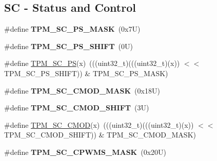 \subsection*{SC -\/ Status and Control}
\begin{DoxyCompactItemize}
\item 
\mbox{\label{group___t_p_m___register___masks_gab20218cf8b49b4d2aa932cfafdf5a43e}} 
\#define {\bfseries T\+P\+M\+\_\+\+S\+C\+\_\+\+P\+S\+\_\+\+M\+A\+SK}~(0x7\+U)
\item 
\mbox{\label{group___t_p_m___register___masks_ga13fca37c98cc93640be8ed1733cb9805}} 
\#define {\bfseries T\+P\+M\+\_\+\+S\+C\+\_\+\+P\+S\+\_\+\+S\+H\+I\+FT}~(0\+U)
\item 
\#define \mbox{\hyperlink{group___t_p_m___register___masks_ga41fa7e0f125e9bdeaf17b70dea969399}{T\+P\+M\+\_\+\+S\+C\+\_\+\+PS}}(x)~(((uint32\+\_\+t)(((uint32\+\_\+t)(x)) $<$$<$ T\+P\+M\+\_\+\+S\+C\+\_\+\+P\+S\+\_\+\+S\+H\+I\+FT)) \& T\+P\+M\+\_\+\+S\+C\+\_\+\+P\+S\+\_\+\+M\+A\+SK)
\item 
\mbox{\label{group___t_p_m___register___masks_ga86346adaa1aec83adbcf3a21289d6400}} 
\#define {\bfseries T\+P\+M\+\_\+\+S\+C\+\_\+\+C\+M\+O\+D\+\_\+\+M\+A\+SK}~(0x18\+U)
\item 
\mbox{\label{group___t_p_m___register___masks_ga9268286302a41feb004444a7b368af69}} 
\#define {\bfseries T\+P\+M\+\_\+\+S\+C\+\_\+\+C\+M\+O\+D\+\_\+\+S\+H\+I\+FT}~(3\+U)
\item 
\#define \mbox{\hyperlink{group___t_p_m___register___masks_gae0978f8437371339fe391bf34ff321bb}{T\+P\+M\+\_\+\+S\+C\+\_\+\+C\+M\+OD}}(x)~(((uint32\+\_\+t)(((uint32\+\_\+t)(x)) $<$$<$ T\+P\+M\+\_\+\+S\+C\+\_\+\+C\+M\+O\+D\+\_\+\+S\+H\+I\+FT)) \& T\+P\+M\+\_\+\+S\+C\+\_\+\+C\+M\+O\+D\+\_\+\+M\+A\+SK)
\item 
\mbox{\label{group___t_p_m___register___masks_ga2ed4f55ed6ec313d2f5c0cef0d9606e7}} 
\#define {\bfseries T\+P\+M\+\_\+\+S\+C\+\_\+\+C\+P\+W\+M\+S\+\_\+\+M\+A\+SK}~(0x20\+U)
\item 
\mbox{\label{group___t_p_m___register___masks_ga1bf84a093f66cf0f37c7b77ee16c32b3}} 

\end{DoxyCompactItemize}
